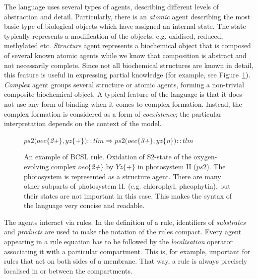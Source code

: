 \documentclass[11pt,a4paper]{report}
\begin{document}
The language uses several types of agents, describing different levels of abstraction and detail. Particularly, there is an \emph{atomic} agent describing the most basic type of biological objects which have assigned an internal state. The state typically represents a modification of the objects, e.g. oxidised, reduced, methylated etc. \emph{Structure} agent represents a biochemical object that is composed of several known atomic agents while we know that composition is abstract and not necessarily complete. Since not all biochemical structures are known in detail, this feature is useful in expressing partial knowledge (for example, see Figure~\ref{ps2_rule}). \emph{Complex} agent groups several structure or atomic agents, forming a non-trivial composite biochemical object. A typical feature of the language is that it does not use any form of binding when it comes to complex formation. Instead, the complex formation is considered as a form of \emph{coexistence}; the particular interpretation depends on the context of the model.

\begin{figure}[!h]
  \begin{center}
    $ \mathit{ps2}(oec\{$\emph{2+}$\}, yz\{$+$\}){::}tlm \Rightarrow \mathit{ps2}(oec\{$\emph{3+}$\}, yz\{$\emph{n}$\}){::}tlm $
  \end{center}
  \caption{An example of BCSL rule. Oxidation of S2-state of the oxygen-evolving complex $oec\{$\emph{2+}$\}$ by $Yz\{+\}$ in photosystem II ($\mathit{ps2}$). The photosystem is represented as a structure agent. There are many other subparts of photosystem II. (e.g. chlorophyl, pheophytin), but their states are not important in this case. This makes the syntax of the language very concise and readable.}\label{ps2_rule}
\end{figure}

The agents interact via rules. In the definition of a rule, identifiers of \emph{substrates} and \emph{products} are used to make the notation of the rules compact. Every agent appearing in a rule equation has to be followed by the \emph{localisation} operator associating it with a particular compartment. This is, for example, important for rules that act on both sides of a membrane. That way, a rule is always precisely localised in or between the compartments.
\end{document}
